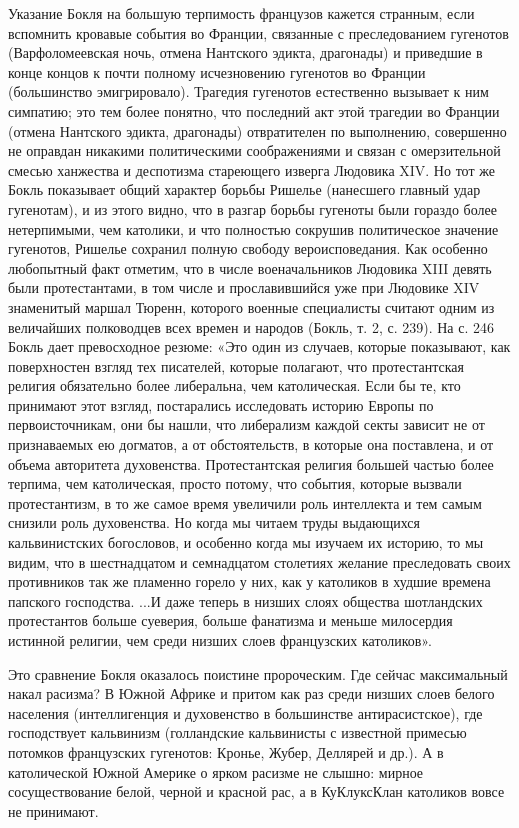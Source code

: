 Указание Бокля на большую  терпимость французов кажется странным, если
вспомнить  кровавые события  во  Франции,  связанные с  преследованием
гугенотов (Варфоломеевская ночь, отмена Нантского эдикта, драгонады) и
приведшие в  конце концов  к почти  полному исчезновению  гугенотов во
Франции  (большинство  эмигрировало). Трагедия  гугенотов  естественно
вызывает к ним симпатию; это тем более понятно, что последний акт этой
трагедии во Франции (отмена  Нантского эдикта, драгонады) отвратителен
по   выполнению,  совершенно   не   оправдан  никакими   политическими
соображениями и  связан с омерзительной смесью  ханжества и деспотизма
стареющего  изверга Людовика  XIV. Но  тот же  Бокль показывает  общий
характер борьбы Ришелье (нанесшего главный удар гугенотам), и из этого
видно, что  в разгар борьбы  гугеноты были гораздо  более нетерпимыми,
чем  католики,   и  что   полностью  сокрушив   политическое  значение
гугенотов,  Ришелье  сохранил   полную  свободу  вероисповедания.  Как
особенно любопытный факт отметим,  что в числе военачальников Людовика
XIII девять были  протестантами, в том числе и  прославившийся уже при
Людовике XIV  знаменитый маршал  Тюренн, которого  военные специалисты
считают одним из величайших полководцев  всех времен и народов (Бокль,
т.  2,  с. 239).  На  с.  246  Бокль  дает превосходное  резюме:  «Это
один  из  случаев, которые  показывают,  как  поверхностен взгляд  тех
писателей,  которые полагают,  что протестантская  религия обязательно
более либеральна,  чем католическая.  Если бы  те, кто  принимают этот
взгляд, постарались исследовать историю Европы по первоисточникам, они
бы нашли,  что либерализм каждой  секты зависит не от  признаваемых ею
догматов, а  от обстоятельств, в  которые она поставлена, и  от объема
авторитета  духовенства. Протестантская  религия большей  частью более
терпима, чем католическая, просто потому, что события, которые вызвали
протестантизм, в  то же  самое время увеличили  роль интеллекта  и тем
самым снизили  роль духовенства. Но  когда мы читаем  труды выдающихся
кальвинистских  богословов, и  особенно когда  мы изучаем  их историю,
то  мы  видим, что  в  шестнадцатом  и семнадцатом  столетиях  желание
преследовать своих  противников так  же пламенно горело  у них,  как у
католиков в  худшие времена  папского господства.  ...И даже  теперь в
низших слоях общества шотландских протестантов больше суеверия, больше
фанатизма и меньше милосердия истинной религии, чем среди низших слоев
французских католиков».

Это  сравнение  Бокля  оказалось   поистине  пророческим.  Где  сейчас
максимальный  накал  расизма?   В  Южной  Африке  и   притом  как  раз
среди  низших слоев  белого населения  (интеллигенция и  духовенство в
большинстве антирасистское), где  господствует кальвинизм (голландские
кальвинисты  с  известной  примесью  потомков  французских  гугенотов:
Кронье, Жубер, Деллярей и др.). А в католической Южной Америке о ярком
расизме не слышно: мирное сосуществование белой, черной и красной рас,
а в КуКлуксКлан католиков вовсе не принимают.

